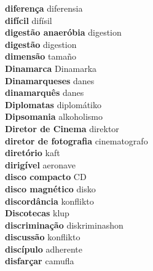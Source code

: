 \textbf{ diferença  } diferensia \\
\textbf{ difícil  } difísil \\
\textbf{ digestão anaeróbia  } digestion \\
\textbf{ digestão  } digestion \\
\textbf{ dimensão  } tamaño \\
\textbf{ Dinamarca  } Dinamarka \\
\textbf{ Dinamarqueses  } danes \\
\textbf{ dinamarquês  } danes \\
\textbf{ Diplomatas  } diplomátiko \\
\textbf{ Dipsomania  } alkoholismo \\
\textbf{ Diretor de Cinema  } direktor \\
\textbf{ diretor de fotografia  } cinematografo \\
\textbf{ diretório  } kaft \\
\textbf{ dirigível  } aeronave \\
\textbf{ disco compacto  } CD \\
\textbf{ disco magnético  } disko \\
\textbf{ discordância  } konflikto \\
\textbf{ Discotecas  } klup \\
\textbf{ discriminação  } diskriminashon \\
\textbf{ discussão  } konflikto \\
\textbf{ discípulo  } adherente \\
\textbf{ disfarçar  } camufla \\
